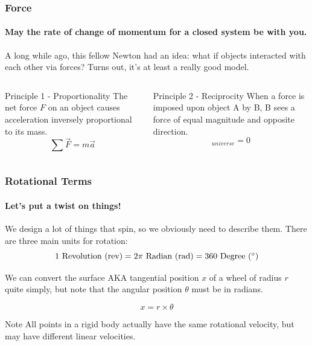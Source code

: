 \documentclass{article}%
\begin{document}
\begin{frame}
\frametitle{Force}
\framesubtitle{May the rate of change of momentum for a closed system be with you.}

A long while ago, this fellow Newton had an idea: what if objects interacted with each other via forces?
Turns out, it's at least a really good model.

\begin{columns}
\begin{block}{Principle 1 - Proportionality}
	The net force $F$ on an object causes acceleration inversely proportional to its mass.
	\begin{equation}
		\sum \vec{F} = m \vec{a}
	\end{equation}
\end{block}

\begin{block}{Principle 2 - Reciprocity}
	When a force is imposed upon object A by B, B sees a force of equal magnitude and opposite direction.
	\begin{equation}
		[\sum \vec{F}]_{universe} = 0
	\end{equation}
\end{block}

\end{columns}

\end{frame}

\begin{frame}
\frametitle{Rotational Terms}
\framesubtitle{Let's put a twist on things!}

We design a lot of things that spin, so we obviously need to describe them. There are three main units for rotation:
\begin{equation}
	1 \mbox{ Revolution (rev)} = 2 \pi \mbox{ Radian (rad)} = 360 \mbox{ Degree (\degree)} \nonumber
\end{equation}


We can convert the surface AKA tangential position $x$ of a wheel of radius $r$ quite simply, but note that the angular position $\theta$ must be in radians.

\begin{equation} 
	x = r \times \theta
\end{equation}

\begin{block}{Note}
	All points in a rigid body actually have the same rotational velocity, but may have different linear velocities.
\end{block}
\end{frame}
\end{document}
